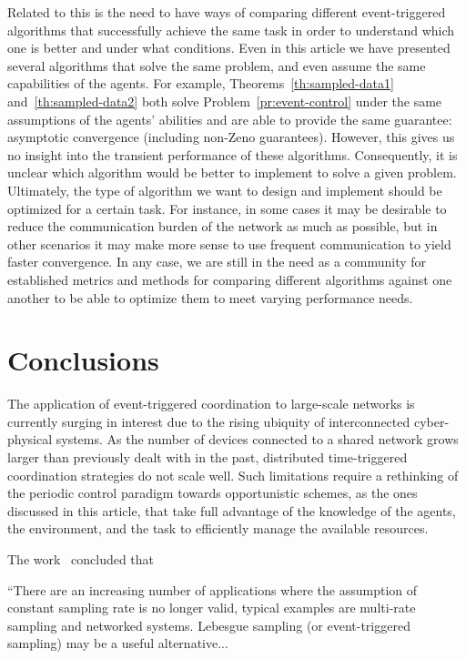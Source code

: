 \documentclass{autart}
\begin{document}
{Related to this is the need to have ways of comparing different
event-triggered algorithms that successfully achieve the same task in
order to understand which one is better and under what conditions.
Even in this article we have presented several algorithms that solve
the same problem, and even assume the same capabilities of the agents.
For example, Theorems~\ref{th:sampled-data1}
and~\ref{th:sampled-data2} both solve Problem~\ref{pr:event-control}
under the same assumptions of the agents' abilities and are able to
provide the same guarantee: asymptotic convergence (including non-Zeno
guarantees). However, this gives us no insight into the transient
performance of these algorithms. Consequently, it is unclear which
algorithm would be better to implement to solve a given problem.
Ultimately, the type of algorithm we want to design and implement
should be optimized for a certain task. For instance, in some cases it
may be desirable to reduce the communication burden of the network as
much as possible, but in other scenarios it may make more sense to use
frequent communication to yield faster convergence. In any case, we
are still in the need as a community for established metrics and
methods for comparing different algorithms against one another to be
able to optimize them to meet varying performance needs.



\section{Conclusions}\label{se:conclusions}

The application of event-triggered coordination to large-scale
networks is currently surging in interest due to the rising ubiquity
of interconnected cyber-physical systems. As the number of devices
connected to a shared network grows larger than previously dealt with
in the past, distributed time-triggered coordination strategies do not
scale well. Such limitations require a rethinking of the periodic
control paradigm towards opportunistic schemes, as the ones discussed
in this article, that take full advantage of the knowledge of the
agents, the environment, and the task to efficiently manage the
available resources.  

The work~\cite{KJA-BMB:02} concluded that
\begin{displayquote}
  ``There are an increasing number of applications where the
  assumption of constant sampling rate is no longer valid, typical
  examples are multi-rate sampling and networked systems. Lebesgue
  sampling (or event-triggered sampling) may be a useful
  alternative...


\end{displayquote}}
\end{document}
